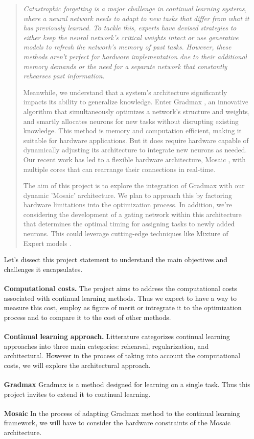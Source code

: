\documentclass{article}
\begin{document}
\begin{quote}
    \itshape
    Catastrophic forgetting is a major challenge in continual learning systems, where a neural network needs to adapt to new tasks that differ from what it has previously learned. To tackle this, experts have devised strategies to either keep the neural network's critical weights intact or use generative models to refresh the network's memory of past tasks. However, these methods aren't perfect for hardware implementation due to their additional memory demands or the need for a separate network that constantly rehearses past information.

    Meanwhile, we understand that a system's architecture significantly impacts its ability to generalize knowledge. Enter Gradmax \cite{gradmax}, an innovative algorithm that simultaneously optimizes a network's structure and weights, and smartly allocates neurons for new tasks without disrupting existing knowledge. This method is memory and computation efficient, making it suitable for hardware applications. But it does require hardware capable of dynamically adjusting its architecture to integrate new neurons as needed. Our recent work has led to a flexible hardware architecture, Mosaic \cite{mosaic}, with multiple cores that can rearrange their connections in real-time.

    The aim of this project is to explore the integration of Gradmax with our dynamic 'Mosaic' architecture. We plan to approach this by factoring hardware limitations into the optimization process. In addition, we're considering the development of a gating network within this architecture that determines the optimal timing for assigning tasks to newly added neurons. This could leverage cutting-edge techniques like Mixture of Expert models \cite{DME}.
\end{quote}

\noindent
Let's dissect this project statement to understand the main objectives and challenges it encapsulates.\\
\\
\noindent
\textbf{Computational costs.} The project aims to address the computational costs associated with continual learning methods. Thus we expect to have a way to measure this cost, employ as figure of merit or intregrate it to the optimization process and to compare it to the cost of other methods.\\
\\
\noindent
\textbf{Continual learning approach.} Litterature categorizes continual learning approaches into three main categories: rehearsal, regularization, and architectural. However in the process of taking into account the computational costs, we will explore the architectural approach.\\
\\
\noindent
\textbf{Gradmax} Gradmax is a method designed for learning on a single task. Thus this project invites to extend it to continual learning. \\
\\
\noindent
\textbf{Mosaic} In the process of adapting Gradmax method to the continual learning framework, we will have to consider the hardware constraints of the Mosaic architecture.
\end{document}
